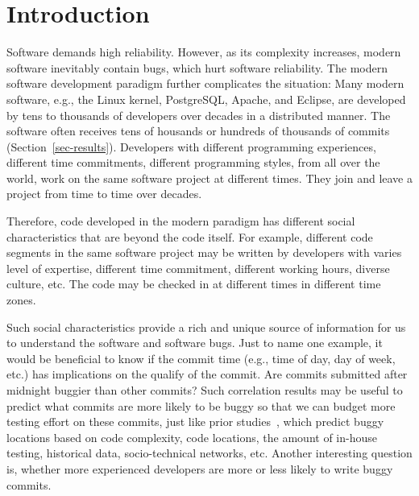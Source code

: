 \section{Introduction}

Software demands high reliability. However, as its complexity increases, 
modern software inevitably contain bugs, which hurt software reliability.
The modern software development paradigm further complicates the situation: 
Many modern software, e.g., the Linux kernel, PostgreSQL, Apache, and Eclipse, 
are developed by tens to thousands of developers over decades %
in a distributed manner. The software often receives tens of housands or hundreds of thousands 
of commits (Section~\ref{sec-results}). 
Developers with different programming experiences, 
different time commitments, different programming styles, from all over the world,
work on the same software project at different times. They join and leave a project 
from time to time over decades.

Therefore, code developed in the modern paradigm has different social characteristics 
that are beyond the code itself. For example, different code segments in the same
software project may be written by developers with  
varies level of expertise, different time 
commitment, different working hours, diverse culture, etc.
The code may be checked in at different times in different time zones. 

Such social characteristics provide a rich and unique source of information for us to 
understand the software and software bugs. Just to name one example, it would be beneficial to know if  
the commit time (e.g., time of day, day of week, etc.) has implications on the qualify of the commit. 
Are commits submitted after midnight buggier than other commits? 
Such correlation results may be useful to predict what commits are more likely
to be buggy so that we can budget more testing effort on these commits, just like prior 
studies~\cite{graves00predicting, guo04robust, Hassan09, devNetwork08, predictionMenzies10, effort03, ostrand05predicting, 
depGraph08, zimmermann-promise-2007},
which predict buggy locations based on code complexity, 
code locations, the amount of in-house testing, historical data, socio-technical networks, etc. 
Another interesting question is, whether more experienced developers are more or less
likely to write buggy commits. 


